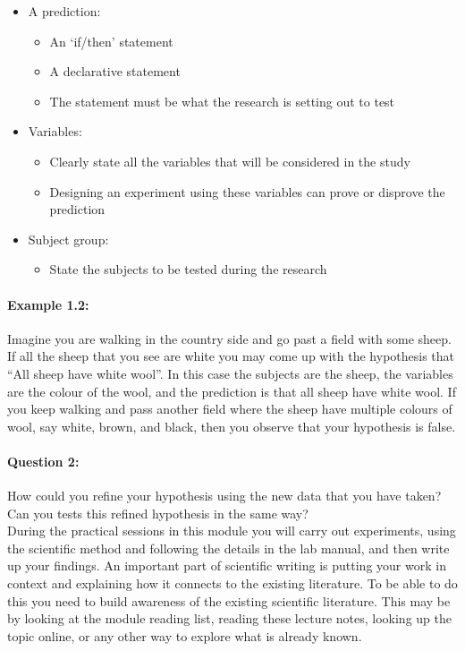 \begin{itemize}
\setlength{\itemsep}{-5pt}
    \item A prediction:
    \begin{itemize}
\setlength{\itemsep}{-5pt}
    \item An `if/then' statement
    \item A declarative statement
    \item The statement must be what the research is setting out to test
\end{itemize}
    \item Variables:
    \begin{itemize}
\setlength{\itemsep}{-5pt}
    \item Clearly state all the variables that will be considered in the study
    \item Designing an experiment using these variables can prove or disprove the prediction
\end{itemize}
    \item Subject group: 
    \begin{itemize}
\setlength{\itemsep}{-5pt}
    \item State the subjects to be tested during the research
\end{itemize}
\end{itemize}

\paragraph{Example 1.2:}Imagine you are walking in the country side and go past a field with some sheep. If all the sheep that you see are white you may come up with the hypothesis that ``All sheep have white wool''. In this case the subjects are the sheep, the variables are the colour of the wool, and the prediction is that all sheep have white wool. If you keep walking and pass another field where the sheep have multiple colours of wool, say white, brown, and black, then you observe that your hypothesis is false.

\paragraph{Question 2:} How could you refine your hypothesis using the new data that you have taken? Can you tests this refined hypothesis in the same way?\\

During the practical sessions in this module you will carry out experiments, using the scientific method and following the details in the lab manual, and then write up your findings. An important part of scientific writing is putting your work in context and explaining how it connects to the existing literature. To be able to do this you need to build awareness of the existing scientific literature. This may be by looking at the module reading list, reading these lecture notes, looking up the topic online, or any other way to explore what is already known.\\

